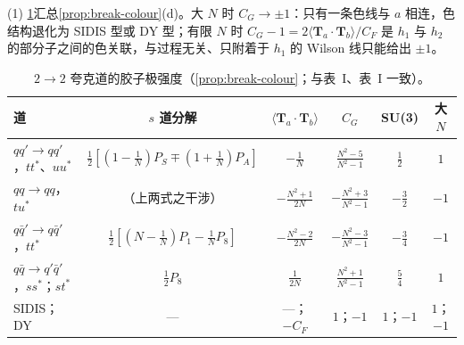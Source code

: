 \begin{example}\label{ex:break-colour}
(1) \cref{tab:break-CG}汇总\cref{prop:break-colour}(d)。大 $N$ 时 $C_G\to\pm1$：只有一条色线与 $a$ 相连，色结构退化为 SIDIS 型或 DY 型；有限 $N$ 时 $C_G-1=2\langle\mathbf T_a\cdot\mathbf T_b\rangle/C_F$ 是 $h_1$ 与 $h_2$ 的部分子之间的色关联，与过程无关、只附着于 $h_1$ 的 Wilson 线只能给出 $\pm1$。

\begin{table}[htbp]
\centering
\caption{$2\to2$ 夸克道的胶子极强度（\cref{prop:break-colour}；与\cite{BacchettaBomhofMuldersPijlman2005}表~I、\cite{QiuVogelsangYuan2007}表~I 一致）。}
\label{tab:break-CG}
\footnotesize
\begin{tabular}{@{}lccccc@{}}
\toprule
道 & $s$ 道分解 & $\langle\mathbf T_a\cdot\mathbf T_b\rangle$ & $C_G$ & SU(3) & 大 $N$ \\
\midrule
$qq'\to qq'$，$tt^*$、$uu^*$ & $\frac12[(1-\frac1N)P_S\mp(1+\frac1N)P_A]$ & $-\frac1N$ & $\frac{N^2-5}{N^2-1}$ & $\frac12$ & $1$ \\
$qq\to qq$，$tu^*$ & （上两式之干涉） & $-\frac{N^2+1}{2N}$ & $-\frac{N^2+3}{N^2-1}$ & $-\frac32$ & $-1$ \\
$q\bar q'\to q\bar q'$，$tt^*$ & $\frac12[(N-\frac1N)P_1-\frac1NP_8]$ & $-\frac{N^2-2}{2N}$ & $-\frac{N^2-3}{N^2-1}$ & $-\frac34$ & $-1$ \\
$q\bar q\to q'\bar q'$，$ss^*$；$st^*$ & $\frac12P_8$ & $\frac1{2N}$ & $\frac{N^2+1}{N^2-1}$ & $\frac54$ & $1$ \\
\midrule
SIDIS；DY & — & —；$-C_F$ & $1$；$-1$ & $1$；$-1$ & $1$；$-1$ \\
\bottomrule
\end{tabular}
\end{table}


\end{example}
